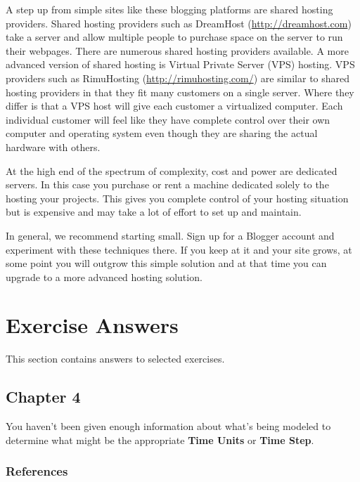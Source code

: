 \documentclass[]{memoir}
\renewcommand{\u}[1]{\textbf{#1}}
\begin{document}
A step up from simple sites like these blogging platforms are shared
hosting providers. Shared hosting providers such as DreamHost
(\url{http://dreamhost.com}) take a server and allow multiple people to
purchase space on the server to run their webpages. There are numerous
shared hosting providers available. A more advanced version of shared
hosting is Virtual Private Server (VPS) hosting. VPS providers such as
RimuHosting (\url{http://rimuhosting.com/}) are similar to shared
hosting providers in that they fit many customers on a single server.
Where they differ is that a VPS host will give each customer a
virtualized computer. Each individual customer will feel like they have
complete control over their own computer and operating system even
though they are sharing the actual hardware with others.

At the high end of the spectrum of complexity, cost and power are
dedicated servers. In this case you purchase or rent a machine dedicated
solely to the hosting your projects. This gives you complete control of
your hosting situation but is expensive and may take a lot of effort to
set up and maintain.

In general, we recommend starting small. Sign up for a Blogger account
and experiment with these techniques there. If you keep at it and your
site grows, at some point you will outgrow this simple solution and at
that time you can upgrade to a more advanced hosting solution.

\chapter{Exercise Answers}

This section contains answers to selected exercises.

\section{Chapter 4}


You haven't been given enough information about what's being modeled to
determine what might be the appropriate \u{Time Units} or \u{Time Step}.

\subsection{References}
\end{document}
